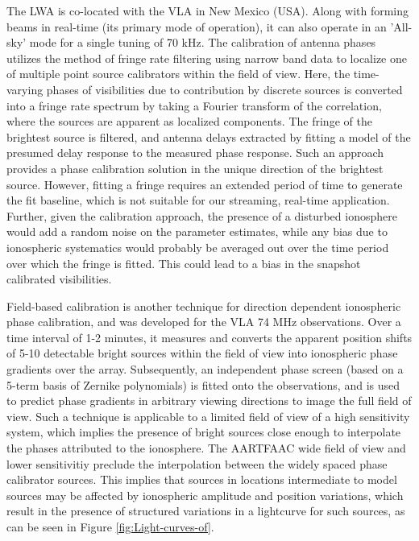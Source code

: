 \documentclass{aa}
\begin{document}
The  LWA  \citep{ellingsonLWA1}  is  co-located  with  the  VLA  in  New  Mexico
(USA). Along with forming beams in real-time (its primary mode of operation), it
can  also operate  in an  'All-sky' mode  for a  single tuning  of 70  kHz.  The
calibration of antenna phases utilizes the method of fringe rate filtering using
narrow band data to localize one of multiple point source calibrators within the
field of view. Here, the time-varying phases of visibilities due to contribution
by discrete sources is converted into a fringe rate spectrum by taking a Fourier
transform  of the  correlation,  where  the sources  are  apparent as  localized
components. The fringe  of the brightest source is  filtered, and antenna delays
extracted by  fitting a  model of  the presumed delay  response to  the measured
phase response.  Such  an approach provides a phase  calibration solution in the
unique direction of the brightest source.  However, fitting a fringe requires an
extended period of time to generate  the fit baseline, which is not suitable for
our streaming, real-time application.   Further, given the calibration approach,
the presence of a disturbed ionosphere would add a random noise on the parameter
estimates,  while any  bias due  to  ionospheric systematics  would probably  be
averaged out  over the time period over  which the fringe is  fitted. This could
lead to a bias in the snapshot calibrated visibilities.

Field-based  calibration  \citep{cottona2004beyond}  is  another  technique  for
direction dependent ionospheric phase calibration, and was developed for the VLA
74  MHz observations.   Over a  time interval  of 1-2  minutes, it  measures and
converts the apparent  position shifts of 5-10 detectable  bright sources within
the field of view into ionospheric phase gradients over the array. Subsequently,
an independent phase screen (based on  a 5-term basis of Zernike polynomials) is
fitted  onto  the  observations, and  is  used  to  predict phase  gradients  in
arbitrary viewing directions to image the  full field of view.  Such a technique
is applicable  to a limited  field of view  of a high sensitivity  system, which
implies the  presence of bright sources  close enough to  interpolate the phases
attributed  to  the  ionosphere. The  AARTFAAC  wide  field  of view  and  lower
sensitivitiy  preclude  the  interpolation   between  the  widely  spaced  phase
calibrator  sources.  This  implies that  sources in  locations  intermediate to
model sources may be affected  by ionospheric amplitude and position variations,
which result in  the presence of structured variations in  a lightcurve for such
sources, as can be seen in Figure \ref{fig:Light-curves-of}.
\end{document}
